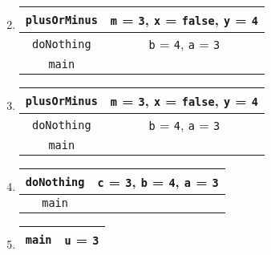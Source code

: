 \documentclass[12pt]{article}
\begin{document}
\begin{enumerate}[label=\alph*)]
\begin{enumerate}[label=\arabic*)]
      \setcounter{enumii}{1}
      \item
        \begin{tabular}{| c | c |}
          \hline
          \texttt{plusOrMinus} &
            \texttt{m} = \texttt{3},
            \texttt{x} = \texttt{false},
            \texttt{y} = \texttt{4}\\
          \hline
          \texttt{doNothing} &
            \texttt{b} = \texttt{4},
            \texttt{a} = \texttt{3}\\
          \hline
          \texttt{main} &\\
          \hline
        \end{tabular}

      \item
        \begin{tabular}{| c | c |}
          \hline
          \texttt{plusOrMinus} &
            \texttt{m} = \texttt{3},
            \texttt{x} = \texttt{false},
            \texttt{y} = \texttt{4}\\
          \hline
          \texttt{doNothing} &
            \texttt{b} = \texttt{4},
            \texttt{a} = \texttt{3}\\
          \hline
          \texttt{main} &\\
          \hline
        \end{tabular}

      \setcounter{enumii}{4}
      \item
        \begin{tabular}{| c | c |}
          \hline
          \texttt{doNothing} &
            \texttt{c} = \texttt{3},
            \texttt{b} = \texttt{4},
            \texttt{a} = \texttt{3}\\
          \hline
          \texttt{main} &\\
          \hline
        \end{tabular}

      \item
        \begin{tabular}{| c | c |}
          \hline
          \texttt{main} & \texttt{u} = \texttt{3}\\
          \hline
        \end{tabular}
    \end{enumerate}
\end{enumerate}
\end{document}
